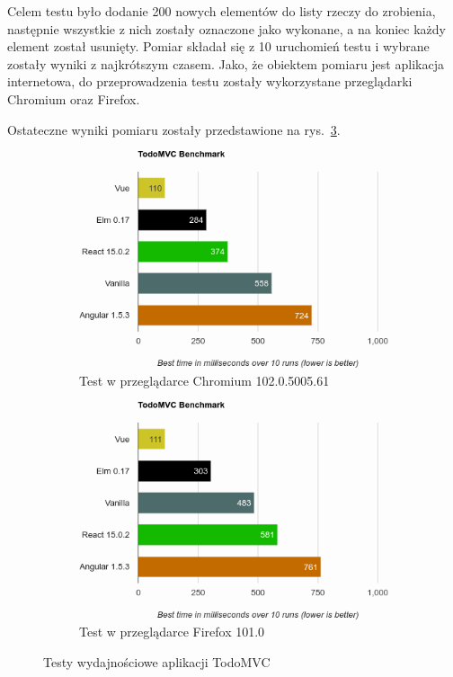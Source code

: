 \documentclass[twoside,a4paper]{report}
\begin{document}
Celem testu było dodanie 200 nowych elementów do listy rzeczy do zrobienia, następnie wszystkie z nich zostały oznaczone jako wykonane, a na koniec każdy element został usunięty.
Pomiar składał się z 10 uruchomień testu i wybrane zostały wyniki z najkrótszym czasem.
Jako, że obiektem pomiaru jest aplikacja internetowa, do przeprowadzenia testu zostały wykorzystane przeglądarki Chromium oraz Firefox.

Ostateczne wyniki pomiaru zostały przedstawione na rys.~\ref{fig:perf}.
\begin{figure}[H]
    \centering
    \begin{subfigure}{.49\textwidth}
        \centering
        \includegraphics[width=1\textwidth]{img/perf_chromium}
        \caption{Test w przeglądarce Chromium 102.0.5005.61}\label{fig:perf_chromium}
    \end{subfigure}
    \begin{subfigure}{.49\textwidth}
        \centering
        \includegraphics[width=1\textwidth]{img/perf_firefox}
        \caption{Test w przeglądarce Firefox 101.0}\label{fig:perf_firefox}
    \end{subfigure}
    \caption{Testy wydajnościowe aplikacji TodoMVC}\label{fig:perf}
\end{figure}
\end{document}
